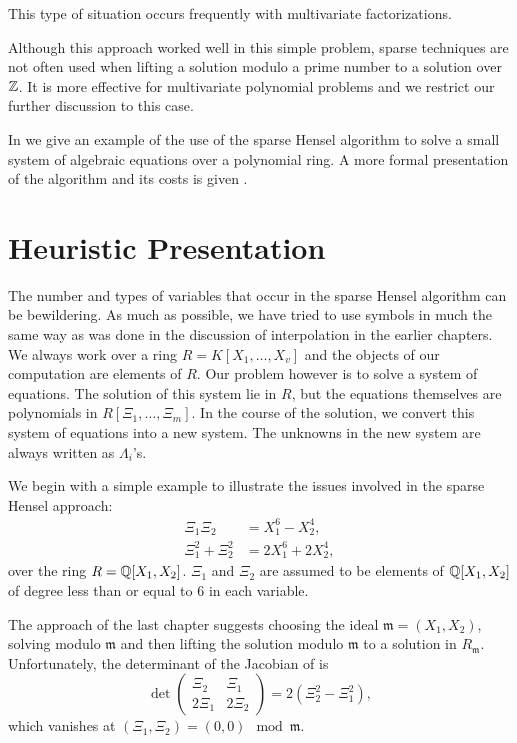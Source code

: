 \noindent
This type of situation occurs frequently with multivariate
factorizations.

Although this approach worked well in this simple problem, sparse
techniques are not often used when lifting a solution modulo a prime
number to a solution over $\mathbb{Z}$.  It is more effective for multivariate 
polynomial problems and we restrict our further discussion to this case.

In  we give an example of the use of the
sparse Hensel algorithm to solve a small system of algebraic equations
over a polynomial ring.  A more formal presentation of the algorithm
and its costs is given .

\section{Heuristic Presentation}
\label{SPH:Heuristic:Sec}

The number and types of variables that occur in the sparse Hensel
algorithm can be bewildering.  As much as possible, we have tried to
use symbols in much the same way as was done in the discussion of
interpolation in the earlier chapters.  We always work over a ring $R = 
K[X_1, \ldots, X_v]$ and the objects of our computation are elements of 
$R$.  Our problem however is to solve a system of equations.  The 
solution of this system lie in $R$, but the equations themselves are 
polynomials in $R[\Xi_1, \ldots, \Xi_m]$. In the course of the solution, 
we convert this system of equations into a new system.  The unknowns in 
the new system are always written as $\Lambda_i$'s.

We begin with a simple example to illustrate the issues involved in
the sparse Hensel approach:
\begin{equation} \label{SPH:2var:Eq}
\begin{aligned}
\Xi_1 \Xi_2 & = X_1^6 - X_2^4, \\
\Xi_1^2 + \Xi_2^2 & = 2X_1^6 + 2X_2^4,
\end{aligned}
\end{equation}
over the ring $R = \mathbb{Q}[X_1, X_2]$.  $\Xi_1$ and $\Xi_2$ are assumed to be
elements of $\mathbb{Q}[X_1, X_2]$ of degree less than or equal to $6$ in each
variable.   

The approach of the last chapter suggests choosing the ideal $\mathfrak{m} = (X_1, X_2)$, solving  modulo $\mathfrak{m}$ and
then lifting the solution modulo $\mathfrak{m}$ to a solution in $R_\mathfrak{m}$.
Unfortunately, the determinant of the Jacobian of 
is
\[
\det \left(\begin{array}{cc} \Xi_2 & \Xi_1 \\ 2\Xi_1 & 2\Xi_2
\end{array}\right) = 2(\Xi_2^2 - \Xi_1^2),
\]
which vanishes at $(\Xi_1, \Xi_2) = (0,0) \mod\mathfrak{m}$.  

